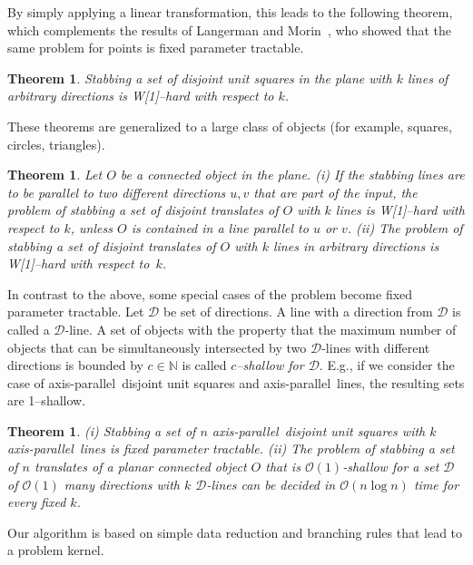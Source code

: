 \documentclass[12pt]{article}
\newtheorem{theorem}[definition]{Theorem}
\newcommand{\cclass}[1]{{#1}}
\newcommand{\wone}{\cclass{W[1]}}
\newcommand{\ap}{a.p.\ }
\renewcommand{\ap}{axis-parallel\ }
\newcommand{\wrt}{w.r.t.\ }
\renewcommand{\wrt}{with respect to\ }
\newcommand{\order}{\mathcal{O}}
\begin{document}
By simply applying a linear transformation, this leads to the following theorem, 
which complements the results of Langerman and Morin~\cite{DBLP:journals/dcg/LangermanM05}, 
who showed that the same problem for points is fixed parameter tractable.

\begin{theorem}\label{thm:woneharddisjointunitsquares}
Stabbing a set of disjoint unit squares in the plane with $k$ lines of arbitrary directions is \wone--hard with respect to $k$.
\end{theorem}

These theorems are generalized to a large class of objects (for example, squares, circles,
triangles).

\begin{theorem}\label{thm:woneharddisjoint} Let $O$ be a connected object in the plane. (i) If the stabbing lines are to be parallel to two different directions $u,v$ that are part of the input, the problem of stabbing a set of disjoint translates of $O$ with $k$ lines is \wone--hard with respect to $k$, unless $O$ is contained in a line parallel to $u$ or $v$. (ii) The problem of stabbing a set of disjoint translates of $O$ with $k$ lines in arbitrary directions is \wone--hard \wrt $k$.
\end{theorem}


In contrast to the above, some special cases of the problem become fixed parameter tractable.
Let $\mathcal D$ be set of directions.
A line with a direction from $\mathcal D$ is called a $\mathcal D$-line.
A set of objects with the property that the maximum number of
objects that can be simultaneously intersected by two $\mathcal D$-lines
with different directions is bounded by $c\in \mathbb{N}$ is called
\emph{$c$--shallow for $\mathcal D$}. E.g., if we consider the case of \ap disjoint unit squares and \ap lines, the resulting sets are 1--shallow.

\begin{theorem}\label{thm:fpt} 
  (i) Stabbing a set of $n$ \ap disjoint unit squares with $k$ \ap lines is fixed parameter tractable. (ii) The problem of stabbing a set of $n$ translates of a planar connected
  object $O$ that is $\order(1)$-shallow for a set $\mathcal D$ of $\order(1)$ many
  directions with $k$ $\mathcal D$-lines can be decided in $\order(n \log n)$
  time for every fixed $k$.
\end{theorem}
Our algorithm is based on simple data reduction and branching rules that lead to a problem kernel.
\end{document}
